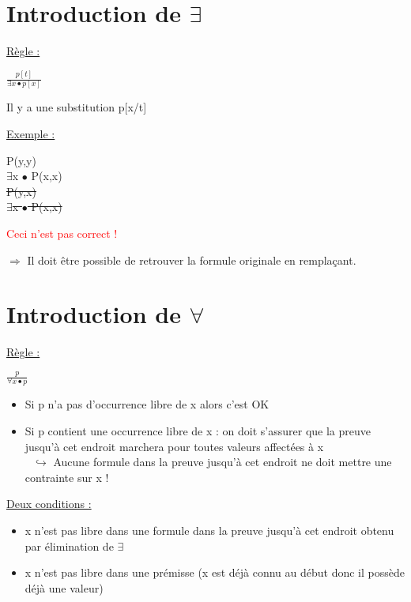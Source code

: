 \begin{flushleft}
\section{Introduction de $\exists$}
\underline{R\`egle :}\\
\begin{center}
{\LARGE $\frac{p[t]}{\exists x \bullet p[x]}$}
\end{center}
\begin{flushright}
Il y a une substitution p[x/t]
\end{flushright}

\underline{Exemple :}\\
\begin{center}
 P(y,y)\\
$\exists$x $\bullet$ P(x,x)\\[2\baselineskip]
\sout{P(y,x)}\\
\sout{$\exists$x $\bullet$ P(x,x)}
\begin{flushright}
\textcolor{red}{Ceci n'est pas correct !}
\end{flushright}
\end{center}
$\Rightarrow$ Il doit être possible de retrouver la formule originale en remplaçant.\\

\section{Introduction de $\forall$}
\underline{R\`egle :}\\
\begin{center}
{\LARGE $\frac{p}{\forall x \bullet p}$}
\end{center}
\begin{itemize}
\item Si p n'a pas d'occurrence libre de x alors c'est OK
\item Si p contient une occurrence libre de x : on doit s'assurer que la preuve jusqu'à cet endroit marchera pour toutes valeurs affectées à x\\
$\> \> \> \hookrightarrow$ Aucune formule dans la preuve jusqu'à cet endroit ne doit mettre une contrainte sur x !
\end{itemize}
\underline{Deux conditions :}\\
\begin{itemize}
\item x n'est pas libre dans une formule dans la preuve jusqu'à cet endroit obtenu par élimination de $\exists$
\item x n'est pas libre dans une prémisse (x est déjà connu au début donc il possède déjà une valeur)
\end{itemize}


\end{flushleft}

